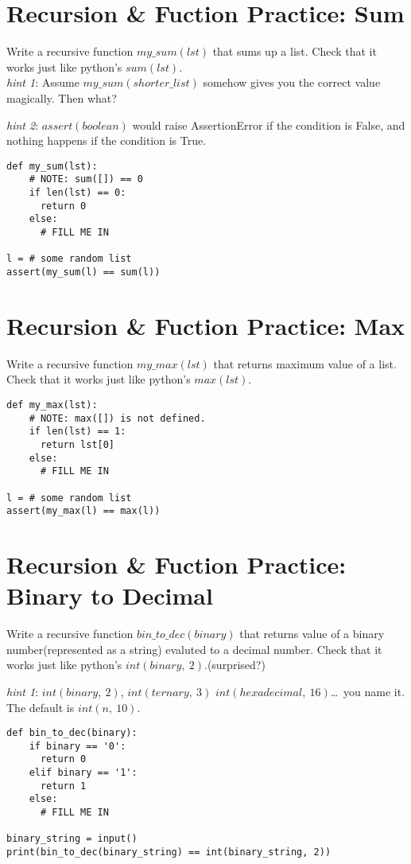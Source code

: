 \documentclass{article}
\begin{document}
\thispagestyle{fancy}
\setcounter{section}{-1}

\section{Recursion \& Fuction Practice: Sum}
Write a recursive function $my\_sum(lst)$ that sums up a list.
Check that it works just like python's $sum(lst)$.\\

\textit{hint 1}: Assume $my\_sum(shorter\_list)$ somehow gives you the correct value
magically. Then what?

\textit{hint 2}: $assert(boolean)$ would raise
AssertionError if the condition is False, and nothing happens if the condition
is True.

\begin{lstlisting}
def my_sum(lst):
    # NOTE: sum([]) == 0
    if len(lst) == 0:
      return 0
    else:
      # FILL ME IN

l = # some random list
assert(my_sum(l) == sum(l))
\end{lstlisting}

\section{Recursion \& Fuction Practice: Max}
Write a recursive function $my\_max(lst)$ that returns maximum value of a
list.
Check that it works just like python's $max(lst)$.
\begin{lstlisting}
def my_max(lst):
    # NOTE: max([]) is not defined.
    if len(lst) == 1:
      return lst[0]
    else:
      # FILL ME IN

l = # some random list
assert(my_max(l) == max(l))
\end{lstlisting}

\section{Recursion \& Fuction Practice: Binary to Decimal}
Write a recursive function $bin\_to\_dec(binary)$ that returns value of a
binary number(represented as a string) evaluted to a decimal number.
Check that it works just like python's $int(binary,\ 2).$(surprised?)

\textit{hint 1}: $int(binary,\ 2)$, $int(ternary,\ 3)$ $int(hexadecimal,\
16)$\ldots\ you name it. The default is $int(n,\ 10)$.
\begin{lstlisting}
def bin_to_dec(binary):
    if binary == '0':
      return 0
    elif binary == '1':
      return 1
    else:
      # FILL ME IN

binary_string = input()
print(bin_to_dec(binary_string) == int(binary_string, 2))
\end{lstlisting}
\end{document}
